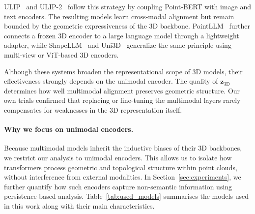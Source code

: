 ULIP~\cite{ulip} and ULIP-2~\cite{ulip2} follow this strategy by coupling Point-BERT with image and text encoders. The resulting models learn cross-modal alignment but remain bounded by the geometric expressiveness of the 3D backbone. PointLLM~\cite{pointllm} further connects a frozen 3D encoder to a large language model through a lightweight adapter, while ShapeLLM~\cite{shapellm} and Uni3D~\cite{uni3d} generalize the same principle using multi-view or ViT-based 3D encoders.

Although these systems broaden the representational scope of 3D models, their effectiveness strongly depends on the unimodal encoder. The quality of $\mathbf{z}_{\text{3D}}$ determines how well multimodal alignment preserves geometric structure. Our own trials confirmed that replacing or fine-tuning the multimodal layers rarely compensates for weaknesses in the 3D representation itself.

\paragraph{Why we focus on unimodal encoders.}
Because multimodal models inherit the inductive biases of their 3D backbones, we restrict our analysis to unimodal encoders. This allows us to isolate how transformers process geometric and topological structure within point clouds, without interference from external modalities. In Section~\ref{sec:experiments}, we further quantify how such encoders capture non-semantic information using persistence-based analysis. Table~\ref{tab:used_models} summarises the models used in this work along with their main characteristics.

